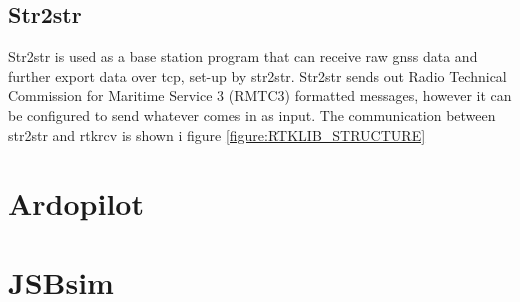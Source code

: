 \subsection{Str2str}
Str2str is used as a base station program that can receive raw \gls{gnss} data and further export data over tcp, set-up by str2str. Str2str sends out Radio Technical Commission for Maritime Service 3 (RMTC3) formatted messages, however it can be configured to send whatever comes in as input. The communication between str2str and rtkrcv is shown i figure \ref{figure:RTKLIB_STRUCTURE}
\section{Ardopilot}
\section{JSBsim}